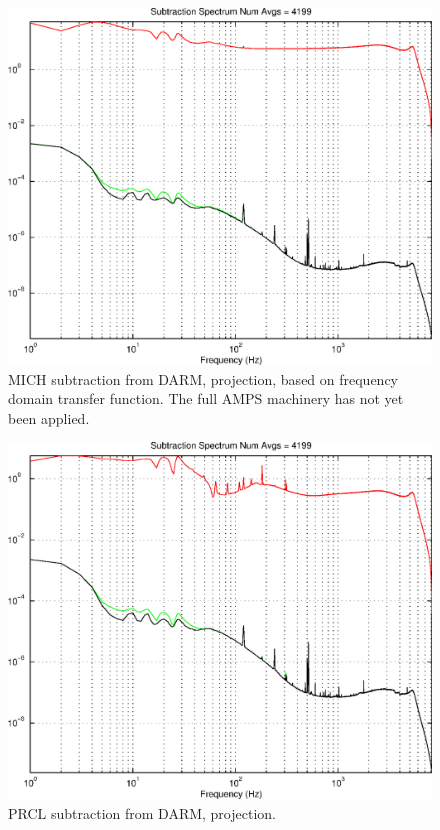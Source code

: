 \begin{figure}
\begin{center}
\includegraphics[width=0.4\paperwidth,height=0.3\paperheight]{SubtractionSpectrum-MICH.eps}
\caption{
MICH subtraction from DARM, projection, based on frequency domain transfer function. The full AMPS machinery has not yet been applied.
}
\end{center}
\end{figure}
\begin{figure}
\begin{center}
\includegraphics[width=0.4\paperwidth,height=0.3\paperheight]{SubtractionSpectrum-PRCL.eps}
\caption{
PRCL subtraction from DARM, projection.
}
\end{center}
\end{figure}
